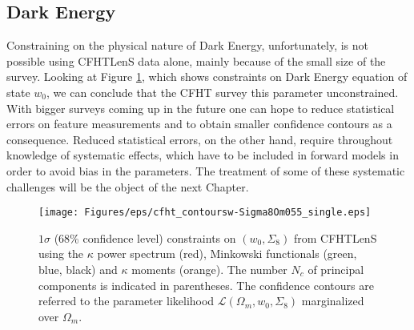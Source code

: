 \subsection{Dark Energy}
Constraining on the physical nature of Dark Energy, unfortunately, is not possible using CFHTLenS data alone, mainly because of the small size of the survey. Looking at Figure \ref{fig:6:cwSi855signle}, which shows constraints on Dark Energy equation of state $w_0$, we can conclude that the CFHT survey this parameter unconstrained. With bigger surveys coming up in the future one can hope to reduce statistical errors on feature measurements and to obtain smaller confidence contours as a consequence. Reduced statistical errors, on the other hand, require throughout knowledge of systematic effects, which have to be included in forward models in order to avoid bias in the parameters. The treatment of some of these systematic challenges will be the object of the next Chapter. 
%
\begin{figure}[h!]
\begin{center}
\texttt{[image: Figures/eps/cfht\_contoursw-Sigma8Om055\_single.eps]}
\end{center}
\caption{$1\sigma$ (68\% confidence level) constraints on $(w_0,\Sigma_8)$ from CFHTLenS using the $\kappa$ power spectrum (red), Minkowski functionals (green, blue, black) and $\kappa$ moments (orange). The number $N_c$ of principal components is indicated in parentheses. The confidence contours are referred to the parameter likelihood $\mathcal{L}(\Omega_m,w_0,\Sigma_8)$ marginalized over $\Omega_m$.}
\label{fig:6:cwSi855signle}
\end{figure}


%